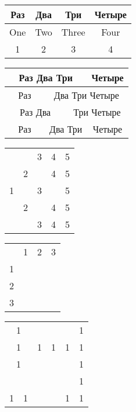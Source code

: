 \documentclass[a4paper,14pt]{extreport}
\begin{document}
	
	\begin{tabular}{|c|c|c|c|}\hline
		Раз & Два & Три & Четыре \\ \hline
		One & Two & Three & Four \\ \hline
		1 & 2 & 3 & 4 \\ \hline
	\end{tabular}
	
	\bigskip
	
	\begin{tabular}{|c|c|c|c|}\hline
		\multicolumn{3}{|c|}{Раз Два Три} & Четыре \\ \hline
		Раз & \multicolumn{3}{|c|}{Два Три Четыре} \\ \hline
		\multicolumn{2}{|c|}{Раз Два} & \multicolumn{2}{|c|}{Три Четыре} \\ \hline
		Раз & \multicolumn{2}{|c|}{Два Три} & Четыре \\ \hline
	\end{tabular}

	\bigskip
	
	\begin{tabular}{|c|c|c|c|c|}\hline
		& & 3 & 4 & 5 \\ \cline {4-5}
		& 2 & & 4 & 5 \\ \cline {2-5}
		1 & & 3 & & 5 \\ \cline {2-5}
		& 2 & & 4 & 5 \\ \cline {4-5}
		& & 3 & 4 & 5 \\ \cline {4-5} \hline
	\end{tabular}

	\bigskip
	
	\begin{tabular}{|c|c|c|c|}\hline
		& 1 & 2 & 3 \\ \cline {1-4}
		1 & & & \\ \cline {1-1}
		2 & & & \\ \cline {1-1}
		3 & & & \\ \cline {1-1} \hline
	\end{tabular}

	\bigskip
	
	\begin{tabular}{|c|c|||c||c|c|c|}\hline
		\multicolumn{2}{|c|}{1} & & & & 1 \\ \cline {1-2} \cline {6-6}
		\multicolumn{2}{|c|}{1} & 1 & 1 & 1 & 1 \\ \hline
		\multicolumn{2}{|c|}{1} & \multicolumn{2}{|c|}{} & & 1 \\ \cline {1-2} \cline {6-6}
		& & \multicolumn{2}{|c|}{} & & 1 \\ \cline {6-6}
		1 & 1 & \multicolumn{2}{|c|}{} & 1 & 1 \\ \cline {6-6} \hline
	\end{tabular}
\end{document}
